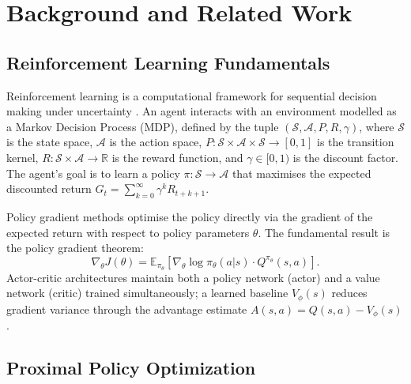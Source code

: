 \chapter{Background and Related Work}\label{ch:background}
\thispagestyle{pagestyle}

\section{Reinforcement Learning Fundamentals}
\label{sec:rl-fundamentals}

Reinforcement learning is a computational framework for sequential
decision making under uncertainty \cite{Sutton2018}. An agent interacts
with an environment modelled as a Markov Decision Process (MDP), defined
by the tuple $(\mathcal{S}, \mathcal{A}, P, R, \gamma)$, where
$\mathcal{S}$ is the state space, $\mathcal{A}$ is the action space,
$P: \mathcal{S} \times \mathcal{A} \times \mathcal{S} \rightarrow [0,1]$
is the transition kernel, $R: \mathcal{S} \times \mathcal{A} \rightarrow
\mathbb{R}$ is the reward function, and $\gamma \in [0,1)$ is the
discount factor. The agent's goal is to learn a policy
$\pi: \mathcal{S} \rightarrow \mathcal{A}$ that maximises the expected
discounted return $G_t = \sum_{k=0}^{\infty} \gamma^k R_{t+k+1}$.

Policy gradient methods optimise the policy directly via the gradient of
the expected return with respect to policy parameters $\theta$.  The
fundamental result is the policy gradient theorem:
\begin{equation}
  \nabla_\theta J(\theta) = \mathbb{E}_{\pi_\theta}
  \left[ \nabla_\theta \log \pi_\theta(a|s) \cdot Q^{\pi_\theta}(s,a) \right].
  \label{eq:pg-theorem}
\end{equation}
Actor-critic architectures maintain both a policy network (actor) and a
value network (critic) trained simultaneously; a learned baseline
$V_\phi(s)$ reduces gradient variance through the advantage estimate
$A(s,a) = Q(s,a) - V_\phi(s)$.

\section{Proximal Policy Optimization}
\label{sec:ppo}

